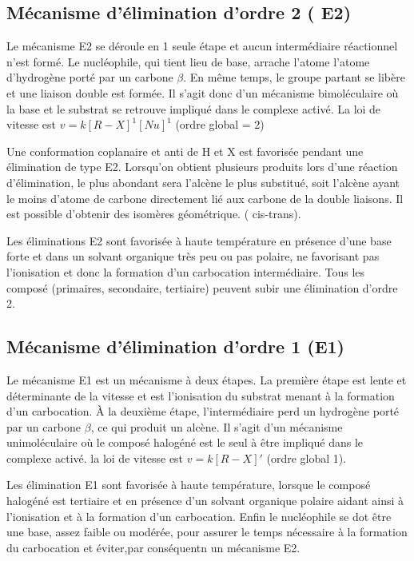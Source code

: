 \subsection{Mécanisme d'élimination d'ordre 2 ( E2)}
Le mécanisme E2 se déroule en 1 seule étape et aucun intermédiaire réactionnel n'est formé.
Le nucléophile, qui tient lieu de base, arrache l'atome l'atome d'hydrogène porté par un carbone $\beta$.
En même temps, le groupe partant se libère et une liaison double est formée.
Il s'agit donc d'un mécanisme bimoléculaire où la base et le substrat se retrouve impliqué dans le complexe activé.
La loi de vitesse est $v = k[R-X]^1[Nu]^1$ (ordre global = 2)

Une conformation coplanaire et anti de H et X est favorisée pendant une élimination de type E2.
Lorsqu'on obtient plusieurs produits lors d'une réaction d'élimination, le plus abondant sera l'alcène le plus substitué, soit l'alcène ayant le moins d'atome de carbone directement lié aux carbone de la double liaisons.
Il est possible d'obtenir des isomères  géométrique.
( cis-trans).

Les éliminations E2 sont favorisée à haute température  en présence d'une base forte et dans un solvant organique très peu ou pas polaire, ne favorisant pas l'ionisation et donc la formation d'un carbocation intermédiaire.
Tous les composé (primaires, secondaire, tertiaire) peuvent subir une élimination d'ordre 2.

\subsection{Mécanisme d'élimination d'ordre 1 (E1)}

Le mécanisme E1 est un mécanisme à deux étapes.
La première étape est lente et déterminante de la vitesse et est l'ionisation du substrat menant à la formation d'un carbocation.
\`A la deuxième étape, l'intermédiaire perd un hydrogène porté par un carbone $\beta$, ce qui produit un alcène.
Il s'agit d'un mécanisme unimoléculaire où le composé halogéné est le seul à être impliqué dans le complexe activé.
la loi de vitesse est  $ v = k[R-X]'$ (ordre global 1).

Les élimination E1 sont favorisée à haute température, lorsque le composé halogéné est tertiaire et en présence d'un solvant organique polaire aidant ainsi à l'ionisation et à la formation d'un carbocation.
Enfin le nucléophile se dot être une base, assez faible ou modérée, pour assurer le temps nécessaire à la formation du carbocation  et éviter,par conséquentn un mécanisme E2.

